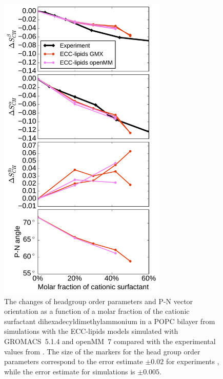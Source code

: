 \documentclass[aip,jcp,twocolumn]{revtex4}
\begin{document}
\begin{figure}[tbp!]
  \centering
  \includegraphics[width=8.0cm]{../Fig/ipython_nb/PN_angle_OrdPars-A-B-g3_L14-ECCL17_q80_sig89_surf_GMX-oMM_compar.pdf}
  \caption{\label{fig:ordPars_surf_GMX_oMM_compar}
    The changes of headgroup order parameters and P-N vector orientation as a function of
    a molar fraction of the cationic surfactant dihexadecyldimethylammonium in a POPC bilayer
    from simulations with the ECC-lipids models
    simulated with GROMACS~5.1.4 \cite{Abraham15} and openMM~7 \cite{openmm7} 
    compared with the experimental values from \cite{scherer89}.
    The size of the markers for the head group order parameters correspond to
    the error estimate $\pm 0.02$ for experiments \cite{botan15,ollila16},
    while the error estimate for simulations is $\pm 0.005$.
  }
\end{figure}
\end{document}
